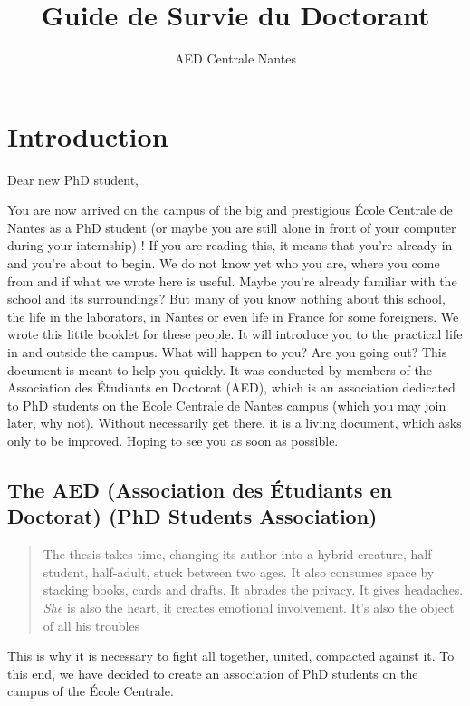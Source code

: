 \documentclass[11pt]{report}
\title{Guide de Survie du Doctorant}
\author{AED Centrale Nantes}
\begin{document}
    \maketitle
\setcounter{page}{0}
\tableofcontents

\newpage
\chapter*{Introduction}
Dear new PhD student,

You are now arrived on the campus of the big and prestigious École Centrale de Nantes as a PhD student (or maybe you are still alone in front of your computer during your internship) !
If you are reading this, it means that you're already in and you're about to begin.
We do not know yet who you are, where you come from and if what we wrote here is useful.
Maybe you're already familiar with the school and its surroundings?
But many of you know nothing about this school, the life in the laborators, in Nantes or even life in France for some foreigners.
We wrote this little booklet for these people.
It will introduce you to the practical life in and outside the campus.
What will happen to you? Are you going out? This document is meant to help you quickly.
It was conducted by members of the Association des Étudiants en Doctorat (AED), which is an association dedicated to PhD students on the Ecole Centrale de Nantes campus (which you may join later, why not).
Without necessarily get there, it is a living document, which asks only to be improved.
Hoping to see you as soon as possible.

\section*{The AED (Association des Étudiants en Doctorat) (PhD Students Association)}
\begin{quotation}
The thesis takes time, changing its author into a hybrid creature, half-student, half-adult, stuck between two ages.
It also consumes space by stacking books, cards and drafts. It abrades the privacy. It gives headaches.
\emph{She} is also the heart,  it creates emotional involvement. It's also the object of all his troubles
\end{quotation}


This is why it is necessary to fight all together, united, compacted against it.
To this end, we have decided to create an association of PhD students on the campus of the École Centrale.
\end{document}
